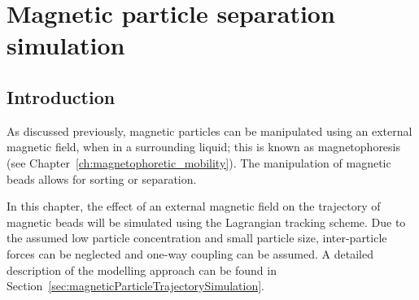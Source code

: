 \chapter{Magnetic particle separation simulation}\label{ch:magneticParticleSeparationSimulation}


\section{Introduction}
As discussed previously, magnetic particles can be manipulated using an external magnetic field, when in a surrounding liquid; this is known as magnetophoresis (see Chapter~\ref{ch:magnetophoretic_mobility}). The manipulation of magnetic beads allows for sorting or separation. 

In this chapter, the effect of an external magnetic field on the trajectory of magnetic beads will be simulated using the Lagrangian tracking scheme. Due to the assumed low particle concentration and small particle size, inter-particle forces can be neglected and one-way coupling can be assumed. A detailed description of the modelling approach can be found in Section~\ref{sec:magneticParticleTrajectorySimulation}.



